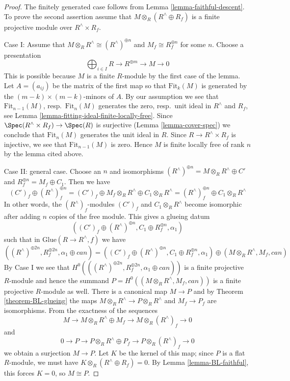\begin{proof}
The finitely generated case follows from Lemma \ref{lemma-faithful-descent}.
To prove the second assertion assume that $M \otimes_R (R^\wedge \oplus R_f)$
is a finite projective module over $R^\wedge \times R_f$.

\medskip\noindent
Case I: Assume that $M \otimes_R R^\wedge \cong (R^\wedge)^{\oplus n}$
and $M_f \cong R_f^{\oplus n}$ for some $n$. Choose a presentation
$$
\bigoplus\nolimits_{i \in I} R \to R^{\oplus m} \to M \to 0
$$
This is possible because $M$ is a finite $R$-module by the first case
of the lemma. Let $A = (a_{ij})$ be the matrix of the first map so that
$\text{Fit}_k(M)$ is generated by the $(m - k) \times (m - k)$-minors
of $A$. By our assumption we see that
$\text{Fit}_{n - 1}(M)$, resp.\ $\text{Fit}_n(M)$
generates the zero, resp.\ unit ideal in $R^\wedge$ and $R_f$, see
Lemma \ref{lemma-fitting-ideal-finite-locally-free}.
Since $\Spec(R^\wedge \times R_f) \to \Spec(R)$ is surjective
(Lemma \ref{lemma-cover-spec}) we conclude that $\text{Fit}_n(M)$
generates the unit ideal in $R$. Since $R \to R^\wedge \times R_f$
is injective, we see that $\text{Fit}_{n - 1}(M)$ is zero.
Hence $M$ is finite locally free of rank $n$ by the lemma cited
above.

\medskip\noindent
Case II: general case. Choose an $n$ and isomorphisms
$(R^\wedge)^{\oplus n} = M \otimes_R R^\wedge \oplus C'$
and $R_f^{\oplus n} = M_f \oplus C_1$. Then we have
$$
(C')_f \oplus (R^\wedge)_f^{\oplus n} =
(C')_f \oplus M_f \otimes_R R^\wedge \oplus C_1 \otimes_R R^\wedge =
(R^\wedge)_f^{\oplus n} \oplus C_1 \otimes_R R^\wedge
$$
In other words, the $(R^\wedge)_f$-modules $(C')_f$ and
$C_1 \otimes_R R^\wedge$ become isomorphic after adding
$n$ copies of the free module. This gives a glueing datum
$$
((C')_f \oplus (R^\wedge)^{\oplus n}, C_1 \oplus R_f^{\oplus n}, \alpha_1)
$$
such that in $\text{Glue}(R \to R^\wedge, f)$ we have
$$
((R^\wedge)^{\oplus 2n}, R_f^{\oplus 2n}, \alpha_1 \oplus can)
=
((C')_f \oplus (R^\wedge)^{\oplus n}, C_1 \oplus R_f^{\oplus n}, \alpha_1)
\oplus
(M \otimes_R R^\wedge, M_f, can)
$$
By Case I we see that
$H^0(((R^\wedge)^{\oplus 2n}, R_f^{\oplus 2n}, \alpha_1 \oplus can))$
is a finite projective $R$-module and hence the summand
$P = H^0((M \otimes_R R^\wedge, M_f, can))$ is a finite projective
$R$-module as well. There is a canonical map
$M \to P$ and by Theorem \ref{theorem-BL-glueing}
the maps $M \otimes_R R^\wedge \to P \otimes_R R^\wedge$
and $M_f \to P_f$ are isomorphisms.
From the exactness of the sequences
$$
M \to M \otimes_R R^\wedge \oplus M_f \to M \otimes_R (R^\wedge)_f  \to 0
$$
and
$$
0 \to P \to P \otimes_R R^\wedge \oplus P_f \to P \otimes_R  (R^\wedge)_f \to 0
$$
we obtain a surjection $M \to P$. Let $K$ be the kernel of this map; since 
$P$ is a flat $R$-module, we must have
$K \otimes_R (R^\wedge \oplus R_f) = 0$.
By Lemma \ref{lemma-BL-faithful}, this forces $K = 0$, so $M \cong P$.
\end{proof}


